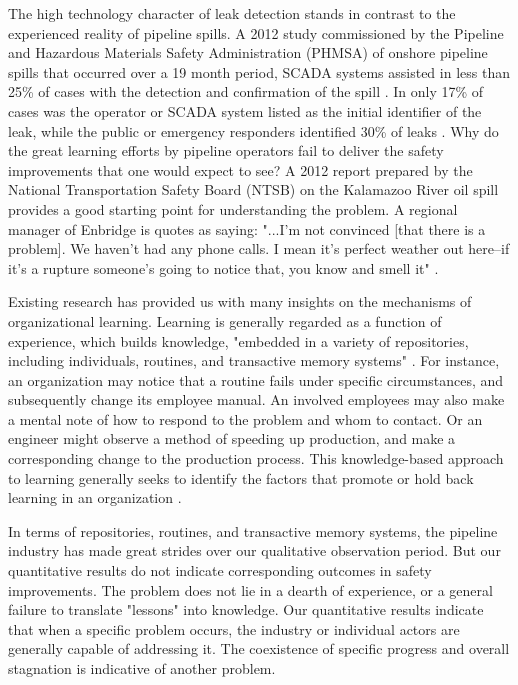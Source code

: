 The high technology character of leak detection stands in contrast to the experienced reality of pipeline spills. A 2012 study commissioned by the Pipeline and Hazardous Materials Safety Administration (PHMSA) of onshore pipeline spills that occurred over a 19 month period, SCADA systems assisted in less than 25\% of cases with the detection and confirmation of the spill \citep[p. 3-33]{Shaw2012}. In only 17\% of cases was the operator or SCADA system listed as the initial identifier of the leak, while the public or emergency responders identified 30\% of leaks \citep[p. 3-39]{Shaw2012}. Why do the great learning efforts by pipeline operators fail to deliver the safety improvements that one would expect to see? A 2012 report prepared by the National Transportation Safety Board (NTSB) on the Kalamazoo River oil spill provides a good starting point for understanding the problem. A regional manager of Enbridge is quotes as saying: "...I'm not convinced [that there is a problem]. We haven't had any phone calls. I mean it's perfect weather out here--if it's a rupture someone's going to notice that, you know and smell it" \citep[p. 100]{NTSB2012}.

Existing research has provided us with many insights on the mechanisms of organizational learning. Learning is generally regarded as a function of experience, which builds knowledge, "embedded in a variety of repositories, including individuals, routines, and transactive memory systems" \citep[p. 1124]{Argote2011}. For instance, an organization may notice that a routine fails under specific circumstances, and subsequently change its employee manual. An involved employees may also make a mental note of how to respond to the problem and whom to contact. Or an engineer might observe a method of speeding up production, and make a corresponding change to the production process. This knowledge-based approach to learning generally seeks to identify the factors that promote or hold back learning in an organization \citep[e.g.,][p. 2]{Argote2013-1}.

In terms of repositories, routines, and transactive memory systems, the pipeline industry has made great strides over our qualitative observation period. But our quantitative results do not indicate corresponding outcomes in safety improvements. The problem does not lie in a dearth of experience, or a general failure to translate "lessons" into knowledge. Our quantitative results indicate that when a specific problem occurs, the industry or individual actors are generally capable of addressing it. The coexistence of specific progress and overall stagnation is indicative of another problem.


